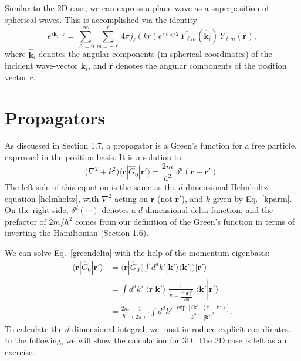 \documentclass[pra,12pt]{revtex4-2}
\begin{document}
Similar to the 2D case, we can express a plane wave as a superposition
of spherical waves.  This is accomplished via the identity
\begin{equation}
  e^{i\mathbf{k}_i \cdot \mathbf{r}}
  = \sum_{\ell=0}^\infty \sum_{m=-\ell}^\ell 4 \pi j_{\ell}(kr) e^{i\ell\pi/2} \,
  Y_{\ell m}^*(\hat{\mathbf{k}}_i) \, Y_{\ell m}(\hat{\mathbf{r}}),
  \label{plane_wave_decomp}
\end{equation}
where $\hat{\mathbf{k}}_i$ denotes the angular components (in
spherical coordinates) of the incident wave-vector $\mathbf{k}_i$, and
$\hat{\mathbf{r}}$ denotes the angular components of the position
vector $\mathbf{r}$.

\section{Propagators}
\label{sec:propagator}

As discussed in Section 1.7, a propagator is a Green's function for a
free particle, expressed in the position basis.  It is a solution to
\begin{equation}
  \Big(\nabla^2 + k^2\Big) \langle\mathbf{r} |\hat{G}_0 |\mathbf{r}'\rangle
  = \frac{2m}{\hbar^2} \; \delta^d(\mathbf{r}-\mathbf{r}').
  \label{greendelta}
\end{equation}
The left side of this equation is the same as the $d$-dimensional
Helmholtz equation \eqref{helmholtz}, with $\nabla^2$ acting on
$\mathbf{r}$ (not $\mathbf{r}'$), and $k$ given by Eq.~\eqref{kparm}.
On the right side, $\delta^d(\cdots)$ denotes a $d$-dimensional delta
function, and the prefactor of $2m/\hbar^2$ comes from our definition
of the Green's function in terms of inverting the Hamiltonian (Section
1.6).

We can solve Eq.~\eqref{greendelta} with the help of the momentum
eigenbasis:
\begin{align}
  \langle\mathbf{r}|\hat{G}_0|\mathbf{r}'\rangle
  &= \langle\mathbf{r}|\hat{G}_0 \Big(\int d^dk' |\mathbf{k}'\rangle\langle\mathbf{k}'| \Big) |\mathbf{r}'\rangle \nonumber \\
  &= \int d^dk' \; \langle\mathbf{r}|\mathbf{k}'\rangle \;
  \frac{1}{E-\frac{\hbar^2|\mathbf{k}'|^2}{2m}} \;
  \langle\mathbf{k}'|\mathbf{r}'\rangle \nonumber \\
  &= \frac{2m}{\hbar^2} \frac{1}{(2\pi)^d} \int d^dk' \;
  \frac{\exp\left[i\mathbf{k}' \cdot
      (\mathbf{r}-\mathbf{r}')\right]}{k^2-|\mathbf{k}'|^2}.
  \label{rGr}
\end{align}
To calculate the $d$-dimensional integral, we must introduce explicit
coordinates.  In the following, we will show the calculation for 3D.
The 2D case is left as an \hyperref[ex:2dpropagator]{exercise}.
\end{document}
